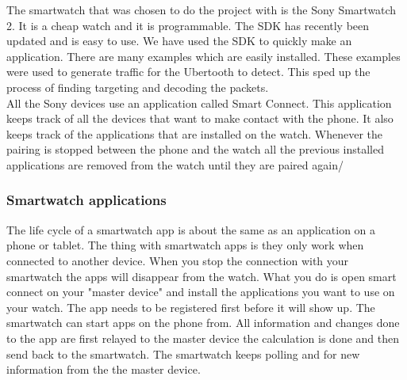 \label{subsec:sw2}
The smartwatch that was chosen to do the project with is the Sony 
Smartwatch 2. It is a cheap watch and it is programmable. The SDK has recently been updated and is easy to use. We have used the SDK to quickly make an application. There are many examples which are easily installed. These examples were used to generate traffic for the Ubertooth to detect. This sped up the process of finding targeting and decoding the packets. \\
All the Sony devices use an application called Smart Connect. This application keeps track of all the devices that want to make contact with the phone. It also keeps track of the applications that are installed on the watch. Whenever the pairing is stopped between the phone and the watch all the previous installed applications are removed from the watch until they are paired again/
\subsubsection{Smartwatch applications}
\label{subsubsec:sw_app}
The life cycle of a smartwatch app is about the same as an application on a phone or tablet. The thing with smartwatch apps is they only work when connected to another device. When you stop the connection with your smartwatch the apps will disappear from the watch. What you do is open smart connect on your "master device" and install the applications you want to use on your watch. The app needs to be registered first before it will show up. The smartwatch can start apps on the phone from. All information and changes done to the app are first relayed to the master device the calculation is done and then send back to the smartwatch. The smartwatch keeps polling and for new information from the the master device. 